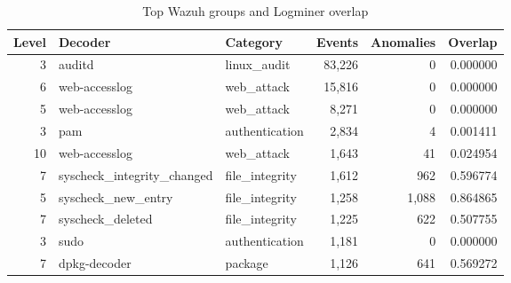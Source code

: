 \begin{table}[t]
\caption{Top Wazuh groups and Logminer overlap}
\label{tab:wazuh_overlap_top}
\centering
\scriptsize
\begin{tabular}{r l l r r r}
\toprule
\textbf{Level} & \textbf{Decoder} & \textbf{Category} & \textbf{Events} & \textbf{Anomalies} & \textbf{Overlap} \\
\midrule
3 & auditd & linux\_audit & 83,226 & 0 & 0.000000 \\
6 & web-accesslog & web\_attack & 15,816 & 0 & 0.000000 \\
5 & web-accesslog & web\_attack & 8,271 & 0 & 0.000000 \\
3 & pam & authentication & 2,834 & 4 & 0.001411 \\
10 & web-accesslog & web\_attack & 1,643 & 41 & 0.024954 \\
7 & syscheck\_integrity\_changed & file\_integrity & 1,612 & 962 & 0.596774 \\
5 & syscheck\_new\_entry & file\_integrity & 1,258 & 1,088 & 0.864865 \\
7 & syscheck\_deleted & file\_integrity & 1,225 & 622 & 0.507755 \\
3 & sudo & authentication & 1,181 & 0 & 0.000000 \\
7 & dpkg-decoder & package & 1,126 & 641 & 0.569272 \\
\bottomrule
\end{tabular}
\end{table}
